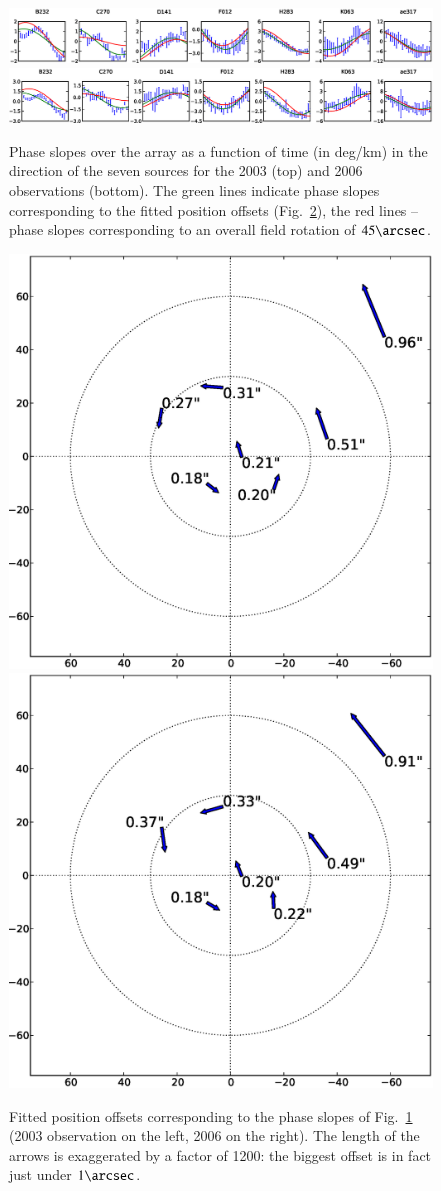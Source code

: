 \documentclass[]{aa}
\begin{document}
\begin{figure}
\centering
\includegraphics[width=\columnwidth]{o2003_dEphase_array_slopes}\\
\includegraphics[width=\columnwidth]{o2006_dEphase_array_slopes}
\caption{\label{fig:dEphase-slope}Phase slopes over the array as a function of time (in deg/km) in the direction of the seven sources for the 2003 (top) and 2006 observations (bottom). The green lines indicate phase slopes corresponding to the fitted position offsets (Fig.~\ref{fig:dEphase-dlm}), the red lines -- phase slopes corresponding to an overall field rotation of $45\arcsec$.}
\end{figure}

\begin{figure}
\centering
\includegraphics[width=.5\columnwidth]{o2003_dE_lm_offsets}%
\includegraphics[width=.5\columnwidth]{o2006_dE_lm_offsets}\\
\caption{\label{fig:dEphase-dlm}Fitted position offsets corresponding to the phase slopes of Fig.~\ref{fig:dEphase-slope} (2003 observation on the left, 2006 on the right). The length of the arrows is exaggerated by a factor of 1200: the biggest offset is in fact just under $1\arcsec$.}
\end{figure}
\end{document}
